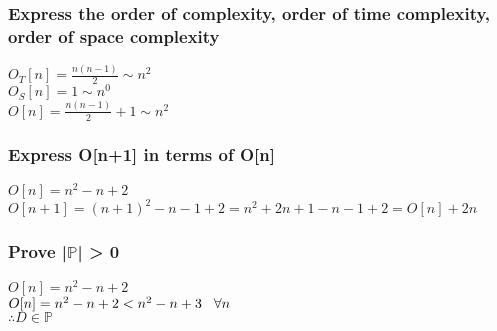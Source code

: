 \documentclass[11pt]{article}
\begin{document}
\subsubsection{Express the order of complexity, order of time complexity, order of space complexity}
\begin{center}
\vspace{1.5mm}
$
O_T[n] = \frac{n(n-1)}{2} \sim n^2
$
\\ \vspace{2mm}
$
O_S[n] = 1 \sim n^0
$
\\ \vspace{2mm}
$
O[n] = \frac{n(n-1)}{2} + 1 \sim n^2
$
\end{center}





\subsubsection{Express O[n+1] in terms of O[n]}
\begin{center}
$
O[n] = n^2 - n + 2 
$
\\ \vspace{2mm}
$
O[n+1] = (n+1)^2 - n - 1  + 2 = n^2 + 2n + 1 - n - 1 + 2 = O[n] + 2n 
$
\end{center}



\subsubsection{Prove |$\mathbb{P}$| > 0}
\begin{center}
$
O[n] = n^2 - n + 2 
$
\\ \vspace{2mm}
$
O[n] = n^2 - n +2  < n^2 - n + 3 \hspace{3mm} \forall n
$
\\ \vspace{2mm}
$
\therefore D \in \mathbb{P}
$
\end{center}








\newpage
\end{document}
